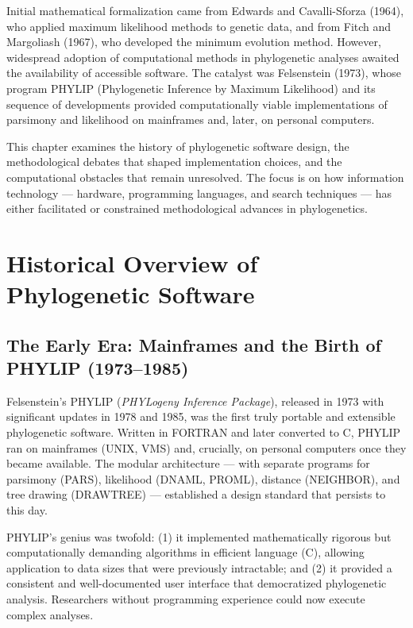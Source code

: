 Initial mathematical formalization came from Edwards and Cavalli-Sforza (1964), who applied maximum likelihood methods to genetic data, and from Fitch and Margoliash (1967), who developed the minimum evolution method. However, widespread adoption of computational methods in phylogenetic analyses awaited the availability of accessible software. The catalyst was Felsenstein (1973), whose program PHYLIP (Phylogenetic Inference by Maximum Likelihood) and its sequence of developments provided computationally viable implementations of parsimony and likelihood on mainframes and, later, on personal computers.

This chapter examines the history of phylogenetic software design, the methodological debates that shaped implementation choices, and the computational obstacles that remain unresolved. The focus is on how information technology --- hardware, programming languages, and search techniques --- has either facilitated or constrained methodological advances in phylogenetics.

\section{Historical Overview of Phylogenetic Software}

\subsection{The Early Era: Mainframes and the Birth of PHYLIP (1973--1985)}

Felsenstein's PHYLIP (\textit{PHYLogeny Inference Package}), released in 1973 with significant updates in 1978 and 1985, was the first truly portable and extensible phylogenetic software. Written in FORTRAN and later converted to C, PHYLIP ran on mainframes (UNIX, VMS) and, crucially, on personal computers once they became available. The modular architecture --- with separate programs for parsimony (PARS), likelihood (DNAML, PROML), distance (NEIGHBOR), and tree drawing (DRAWTREE) --- established a design standard that persists to this day.

PHYLIP's genius was twofold: (1) it implemented mathematically rigorous but computationally demanding algorithms in efficient language (C), allowing application to data sizes that were previously intractable; and (2) it provided a consistent and well-documented user interface that democratized phylogenetic analysis. Researchers without programming experience could now execute complex analyses.

